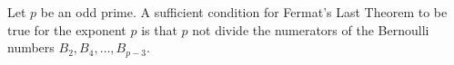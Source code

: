 Let $p$ be an odd prime. A sufficient condition for Fermat's Last Theorem to be true for the exponent $p$ is that $p$ not divide the numerators of the Bernoulli numbers $B_2, B_4, \ldots, B_{p-3}$.
